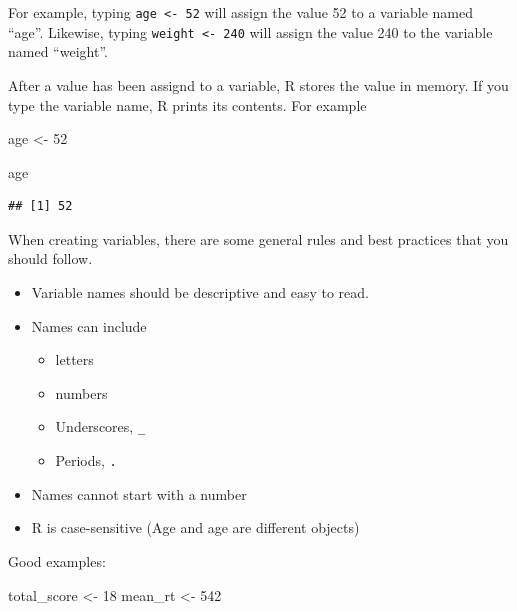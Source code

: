 \documentclass[
  11pt,
]{article}
\newenvironment{Shaded}{\begin{snugshade}}{\end{snugshade}}
\newcommand{\DecValTok}[1]{\textcolor[rgb]{0.00,0.00,0.81}{#1}}
\newcommand{\NormalTok}[1]{#1}
\newcommand{\OtherTok}[1]{\textcolor[rgb]{0.56,0.35,0.01}{#1}}
\providecommand{\tightlist}{%
  \setlength{\itemsep}{0pt}\setlength{\parskip}{0pt}}
\begin{document}
For example, typing \texttt{age\ \textless{}-\ 52} will assign the value
52 to a variable named ``age''. Likewise, typing
\texttt{weight\ \textless{}-\ 240} will assign the value 240 to the
variable named ``weight''.

After a value has been assignd to a variable, R stores the value in
memory. If you type the variable name, R prints its contents. For
example

\begin{Shaded}
\begin{Highlighting}[]
\NormalTok{age }\OtherTok{\textless{}{-}} \DecValTok{52}
\end{Highlighting}
\end{Shaded}

\begin{Shaded}
\begin{Highlighting}[]
\NormalTok{age}
\end{Highlighting}
\end{Shaded}

\begin{verbatim}
## [1] 52
\end{verbatim}

When creating variables, there are some general rules and best practices
that you should follow.

\begin{itemize}
\tightlist
\item
  Variable names should be descriptive and easy to read.
\item
  Names can include

  \begin{itemize}
  \tightlist
  \item
    letters
  \item
    numbers
  \item
    Underscores, \texttt{\_}
  \item
    Periods, \texttt{.}
  \end{itemize}
\item
  Names cannot start with a number
\item
  R is case-sensitive (Age and age are different objects)
\end{itemize}

Good examples:

\begin{Shaded}
\begin{Highlighting}[]
\NormalTok{total\_score }\OtherTok{\textless{}{-}} \DecValTok{18}
\NormalTok{mean\_rt }\OtherTok{\textless{}{-}} \DecValTok{542}
\end{Highlighting}
\end{Shaded}
\end{document}
